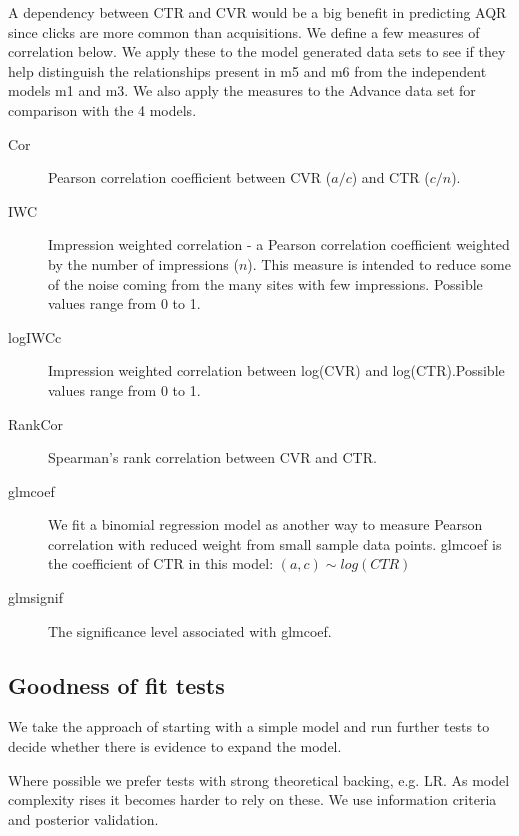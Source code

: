 \documentclass[11pt,a4,singlespacing,titlepagenumber=on]{scrreprt}
\numberwithin{equation}{chapter} %
\theoremstyle{remark}
\begin{document}
A dependency between CTR and CVR would be a big benefit in predicting AQR since clicks are more common than acquisitions. We define a few measures of correlation below. We apply these to the model generated data sets to see if they help distinguish the relationships present in m5 and m6 from the independent models m1 and m3. We also apply the measures to the Advance data set for comparison with the 4 models.

\begin{description}
	\item[Cor] Pearson correlation coefficient between CVR ($a/c$) and CTR ($c/n$).
	\item[IWC] Impression weighted correlation - a Pearson correlation coefficient weighted by the number of impressions ($n$). This measure is intended to reduce some of the noise coming from the many sites with few impressions. Possible values range from 0 to 1.
	\item[logIWCc] Impression weighted correlation between log(CVR) and log(CTR).Possible values range from 0 to 1.
	\item[RankCor] Spearman's rank correlation between CVR and CTR.
	\item[glmcoef] We fit a binomial regression model as another way to measure Pearson correlation with reduced weight from small sample data points. glmcoef is the coefficient of CTR in this model:
	$(a,c) \sim log(CTR)$ 
	\item[glmsignif] The significance level associated with glmcoef.
\end{description}


\subsection{Goodness of fit tests}

We take the approach of starting with a simple model and run further tests to decide whether there is evidence to expand the model. 

Where possible we prefer tests with strong theoretical backing, e.g. LR. As model complexity rises it becomes harder to rely on these. We use information criteria and posterior validation.
\end{document}
